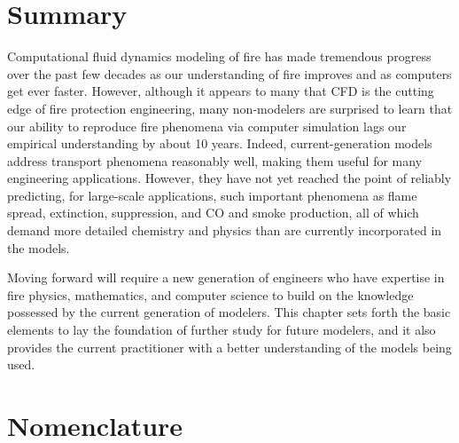 \documentclass[graybox]{svmult}
\begin{document}
\section{Summary}

Computational fluid dynamics modeling of fire has made tremendous progress over the past few decades as our understanding of fire improves and as computers get ever faster. However, although it appears to many that CFD is the cutting edge of fire protection engineering, many non-modelers are surprised to learn that our ability to reproduce fire phenomena via computer simulation lags our empirical understanding by about 10 years. Indeed, current-generation models address transport phenomena reasonably well, making them useful for many engineering applications. However, they have not yet reached the point of reliably predicting, for large-scale applications, such important phenomena as flame spread, extinction, suppression, and CO and smoke production, all of which demand more detailed chemistry and physics than are currently incorporated in the models.

Moving forward will require a new generation of engineers who have expertise in fire physics, mathematics, and computer science to build on the knowledge possessed by the current generation of modelers. This chapter sets forth the basic elements to lay the foundation of further study for future modelers, and it also provides the current practitioner with a better understanding of the models being used.



\section{Nomenclature}
\end{document}
